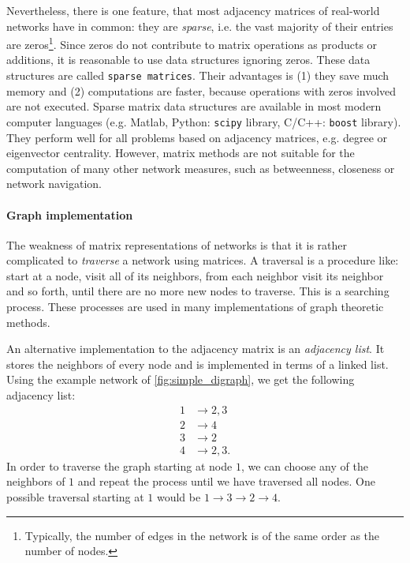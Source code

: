 \documentclass[openright,twoside,headsepline]{scrbook}
\begin{document}
Nevertheless, there is one feature, that most adjacency matrices of real-world networks have in common:
they are \emph{sparse}, i.e. the vast majority of their entries are zeros\footnote{Typically, the number of edges in the network is of the same order as the number of nodes.}.
Since zeros do not contribute to matrix operations as products or additions, it is reasonable to use data structures ignoring zeros.
These data structures are called \verb"sparse matrices".
Their advantages is (1) they save much memory and (2) computations are faster, because operations with zeros involved are not executed.
Sparse matrix data structures are available in most modern computer languages (e.g. Matlab, Python: \verb"scipy" library, C/C++: \verb"boost" library).
They perform well for all problems based on adjacency matrices, e.g. degree or eigenvector centrality.
However, matrix methods are not suitable for the computation of many other network measures, such as betweenness, closeness or network navigation.

\paragraph{Graph implementation\color{Cayenne}{.}}
The weakness of matrix representations of networks is that it is rather complicated to \emph{traverse} a network using matrices.
A traversal is a procedure like: start at a node, visit all of its neighbors, from each neighbor visit its neighbor and so forth, until there are no more new nodes to traverse.
This is a searching process.
These processes are used in many implementations of graph theoretic methods.

An alternative implementation to the adjacency matrix is an \emph{adjacency list}.
It stores the neighbors of every node and is implemented in terms of a linked list.
Using the example network of \ref{fig:simple_digraph}, we get the following adjacency list:
\begin{align*}
1 &\rightarrow 2,3 \\
2 &\rightarrow 4 \\
3 &\rightarrow 2 \\
4 &\rightarrow 2,3 .
\end{align*}
In order to traverse the graph starting at node $1$, we can choose any of the neighbors of $1$ and repeat the process until we have traversed all nodes.
One possible traversal starting at $1$ would be $1\rightarrow 3 \rightarrow 2 \rightarrow 4$.
\end{document}
